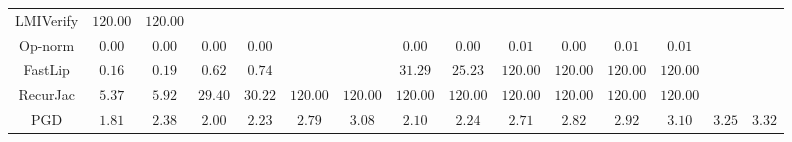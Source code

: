 \begin{table*}
{\begin{tabular}{c|c|c|c|c|c|c|c|c|c|c|c|c|c|c}
    LMIVerify &      $120.00$ &      $120.00$ &               &               &               &               &               &               &               &               &               &               &               &               \\
      Op-norm &        $0.00$ &        $0.00$ &        $0.00$ &        $0.00$ &               &               &        $0.00$ &        $0.00$ &        $0.01$ &        $0.00$ &        $0.01$ &        $0.01$ &               &               \\
      FastLip &        $0.16$ &        $0.19$ &        $0.62$ &        $0.74$ &               &               &       $31.29$ &       $25.23$ &      $120.00$ &      $120.00$ &      $120.00$ &      $120.00$ &               &               \\
     RecurJac &        $5.37$ &        $5.92$ &       $29.40$ &       $30.22$ &      $120.00$ &      $120.00$ &      $120.00$ &      $120.00$ &      $120.00$ &      $120.00$ &      $120.00$ &      $120.00$ &               &               \\
\hline
          PGD &        $1.81$ &        $2.38$ &        $2.00$ &        $2.23$ &        $2.79$ &        $3.08$ &        $2.10$ &        $2.24$ &        $2.71$ &        $2.82$ &        $2.92$ &        $3.10$ &        $3.25$ &        $3.32$ \\

    \bottomrule
    \end{tabular}
    \label{table:exp-A-average-radius-time-mnist-3}
    }
\end{table*}
        

